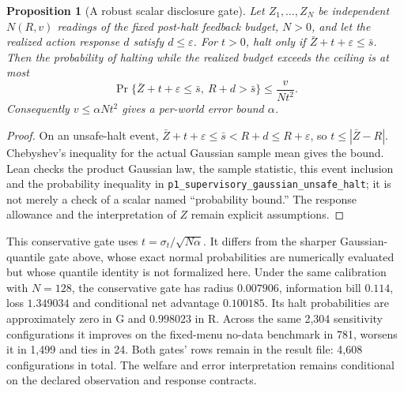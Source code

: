 \documentclass[12pt]{article}
\newtheorem{proposition}[theorem]{Proposition}
\theoremstyle{definition}
\theoremstyle{remark}
\begin{document}
\begin{proposition}[A robust scalar disclosure gate]\label{prop:robust_gate}
Let $Z_1,\ldots,Z_N$ be independent $N(R,v)$ readings of the fixed post-halt feedback budget, $N>0$, and let the realized action response $d$ satisfy $d\le\varepsilon$. For $t>0$, halt only if $\bar Z+t+\varepsilon\le\bar s$. Then the probability of halting while the realized budget exceeds the ceiling is at most
\[
 \Pr\{\bar Z+t+\varepsilon\le\bar s,\ R+d>\bar s\}
 \le \frac{v}{Nt^2}.
\]
Consequently $v\le\alpha Nt^2$ gives a per-world error bound $\alpha$.
\end{proposition}
\begin{proof}
On an unsafe-halt event, $\bar Z+t+\varepsilon\le\bar s<R+d\le R+\varepsilon$, so $t\le|\bar Z-R|$. Chebyshev's inequality for the actual Gaussian sample mean gives the bound. Lean checks the product Gaussian law, the sample statistic, this event inclusion and the probability inequality in \nolinkurl{p1_supervisory_gaussian_unsafe_halt}; it is not merely a check of a scalar named ``probability bound.'' The response allowance and the interpretation of $Z$ remain explicit assumptions.
\end{proof}

This conservative gate uses $t=\sigma_t/\sqrt{N\alpha}$. It differs from the sharper Gaussian-quantile gate above, whose exact normal probabilities are numerically evaluated but whose quantile identity is not formalized here. Under the same calibration with $N=128$, the conservative gate has radius $0.007906$, information bill $0.114$, loss $1.349034$ and conditional net advantage $0.100185$. Its halt probabilities are approximately zero in G and $0.998023$ in R. Across the same 2,304 sensitivity configurations it improves on the fixed-menu no-data benchmark in 781, worsens it in 1,499 and ties in 24. Both gates' rows remain in the result file: 4,608 configurations in total. The welfare and error interpretation remains conditional on the declared observation and response contracts.
\end{document}
